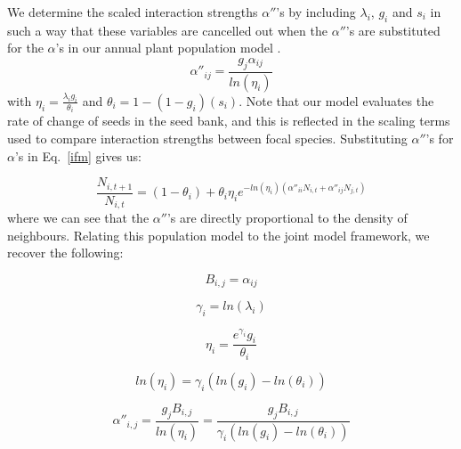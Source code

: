 \begin{refsection}
        We determine the scaled interaction strengths ${\alpha}''$'s by including \(\lambda_{i}\), \(g_{i}\) and \(s_{i}\) in such a way that these variables are cancelled out when the ${\alpha}''$'s are substituted for the $\alpha$'s in our annual plant population model \parencite{Godoy2014, Bimler2018}. 
        \begin{equation}
            {\alpha}''_{ij} = \frac{g_{j} \alpha_{ij}}{ln(\eta_{i})}
        \end{equation}
        with $\eta_{i} = \frac{\lambda_{i} g_{i}}{\theta_{i}}$ and $\theta_{i} = 1 - (1 - g_{i})(s_{i})$. 
        Note that our model evaluates the rate of change of seeds in the seed bank, and this is reflected in the scaling terms used to compare interaction strengths between focal species. Substituting ${\alpha}''$'s for $\alpha$'s in Eq.~\ref{ifm} gives us: 
    
        \begin{equation}
            \frac{N_{i, t+1}}{N_{i, t}} = (1 - \theta_{i}) + \theta_{i} \eta_{i} e^{-ln(\eta_{i})({\alpha}''_{ii} N_{i, t} + {\alpha}''_{ij} N_{j, t})}
        \end{equation}
        where we can see that the ${\alpha}''$'s are directly proportional to the density of neighbours. Relating this population model to the joint model framework, we recover the following: 

        \begin{equation}
        B_{i, j} = \alpha_{ij} %
        \end{equation}

        \begin{equation}
        \gamma_{i}  = ln(\lambda_{i})  %
        \end{equation}

        \begin{equation}
        \eta_{i} = \frac{e^{\gamma_{i}} g_{i}}{\theta_{i}}
        \end{equation}

        \begin{equation}
        ln(\eta_{i}) = \gamma_{i} \left( ln(g_i) - ln(\theta_i) \right)
        \end{equation}

        \begin{equation}
        {\alpha}''_{i, j} = \frac{g_j B_{i,j}}{ln(\eta_i)} = \frac{g_j B_{i,j}}{\gamma_{i} \left( ln(g_i) - ln(\theta_i) \right)} 
        \label{alphaprime}
        \end{equation}


\end{refsection}
